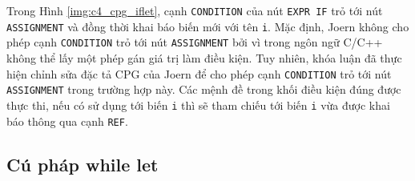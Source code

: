 
Trong Hình \ref{img:c4_cpg_iflet}, cạnh \texttt{CONDITION} của nút \texttt{EXPR IF} trỏ tới nút \texttt{ASSIGNMENT} và đồng thời khai báo biến mới với tên \texttt{i}.
Mặc định, Joern không cho phép cạnh \texttt{CONDITION} trỏ tới nút \texttt{ASSIGNMENT} bởi vì trong ngôn ngữ C/C++ không thể lấy một phép gán giá trị làm điều kiện.
Tuy nhiên, khóa luận đã thực hiện chỉnh sửa đặc tả CPG của Joern để cho phép cạnh \texttt{CONDITION} trỏ tới nút \texttt{ASSIGNMENT} trong trường hợp này.
Các mệnh đề trong khối điều kiện đúng được thực thi, nếu có sử dụng tới biến \texttt{i} thì sẽ tham chiếu tới biến \texttt{i} vừa được khai báo thông qua cạnh \texttt{REF}.

\subsection{Cú pháp while let}




